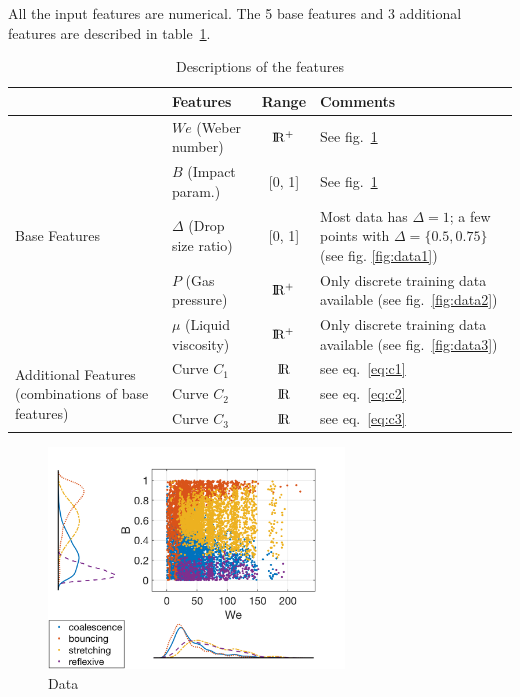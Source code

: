 \documentclass{article}
\begin{document}
All the input features are numerical. The 5 base features and 3 additional features are described in table~\ref{tab:features}. 

\begin{table}[h]
  \caption{Descriptions of the features}
  \label{tab:features}
  \centering
  \begin{tabular}{l l c p{5cm}}
    \toprule
    & 							Features		  			& Range & Comments\\
    \midrule
   \multirow{ 5}{*}{Base Features} 	& $We$ (Weber number)      	& $\rm I\!R^+$ 	& See fig.~\ref{fig:data0}  \\
     							& $B$ (Impact param.)		& [0, 1]  			& See fig.~\ref{fig:data0} \\
    							& $\Delta$ (Drop size ratio)  	& [0, 1]  			& Most data has $\Delta = 1$; a few points with $\Delta = \{0.5, 0.75\}$ (see fig. \ref{fig:data1})   \\
    							& $P$ (Gas pressure) 		& $\rm I\!R^+$	&  Only discrete training data available (see fig.~\ref{fig:data2})\\
    							& $\mu$ (Liquid viscosity) 		& $\rm I\!R^+$ 	& Only discrete training data available (see fig.~\ref{fig:data3}) \\
   \midrule
   \multirow{ 3}{3cm}{Additional Features (combinations of base features)} 	& Curve $C_1$     			& $\rm I\!R$ &  see eq.~\ref{eq:c1}\\
     							& Curve $C_2$					& $\rm I\!R$  & see eq.~\ref{eq:c2} \\
    							& Curve $C_3$  					& $\rm I\!R$  & see eq.~\ref{eq:c3}\\
    \bottomrule
  \end{tabular}
\end{table}


\begin{figure}[h]
	\centering
	\includegraphics[width=0.7\textwidth]{../figures/data_scatterhist.png}
	\caption{Data}
	\label{fig:data0}
\end{figure}
\end{document}
